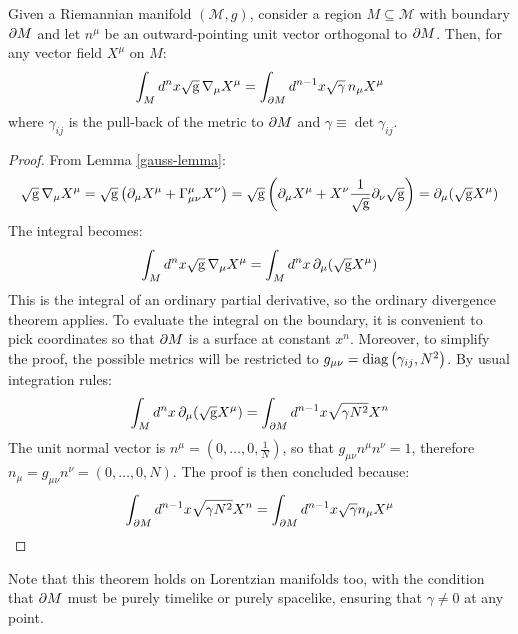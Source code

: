 \begin{theorem}[Gauss]
  Given a Riemannian manifold $ (\mathcal{M},g) $, consider a region $ M \subseteq \mathcal{M} $ with boundary $ \partial M $ and let $ n^\mu $ be an outward-pointing unit vector orthogonal to $ \partial M $. Then, for any vector field $ X^\mu $ on $ M $:
  \begin{equation}
    \int_M d^n x \sqrt{\mathrm{g}}\, \nabla_\mu X^\mu = \int_{\partial M} d^{n-1} x \sqrt{\gamma}\, n_\mu X^\mu
    \label{eq:3.41}
  \end{equation}
  where $ \gamma_{ij} $ is the pull-back of the metric to $ \partial M $ and $ \gamma \equiv \det \gamma_{ij} $.
\end{theorem}
\begin{proof}
  From Lemma \ref{gauss-lemma}:
  \begin{equation*}
    \sqrt{\mathrm{g}}\, \nabla_\mu X^\mu = \sqrt{\mathrm{g}} \left( \partial_\mu X^\mu + \Gamma^\mu_{\mu \nu} X^\nu \right) = \sqrt{\mathrm{g}} \left( \partial_\mu X^\mu + X^\nu \frac{1}{\sqrt{\mathrm{g}}} \partial_\nu \sqrt{\mathrm{g}} \right) = \partial_\mu ( \sqrt{\mathrm{g}} X^\mu )
  \end{equation*}
  The integral becomes:
  \begin{equation*}
    \int_M d^n x \sqrt{\mathrm{g}}\, \nabla_\mu X^\mu = \int_M d^n x\, \partial_\mu (\sqrt{\mathrm{g}} X^\mu)
  \end{equation*}
  This is the integral of an ordinary partial derivative, so the ordinary divergence theorem applies. To evaluate the integral on the boundary, it is convenient to pick coordinates so that $ \partial M $ is a surface at constant $ x^n $. Moreover, to simplify the proof, the possible metrics will be restricted to $ g_{\mu \nu} = \operatorname{diag} \left( \gamma_{ij}, N^2 \right) $. By usual integration rules:
  \begin{equation*}
    \int_M d^n x\, \partial_\mu ( \sqrt{\mathrm{g}} X^\mu) = \int_{\partial M} d^{n-1} x \sqrt{\gamma N^2} X^n
  \end{equation*}
  The unit normal vector is $ n^\mu = (0,\dots,0,\frac{1}{N}) $, so that $ g_{\mu \nu} n^\mu n^\nu = 1 $, therefore $ n_\mu = g_{\mu \nu} n^\nu = (0,\dots,0,N) $. The proof is then concluded because:
  \begin{equation*}
    \int_{\partial M} d^{n-1} x\sqrt{\gamma N^2} X^n = \int_{\partial M} d^{n-1} x \sqrt{\gamma} n_\mu X^\mu
  \end{equation*}
\end{proof}

Note that this theorem holds on Lorentzian manifolds too, with the condition that $ \partial M $ must be purely timelike or purely spacelike, ensuring that $ \gamma \neq 0 $ at any point.

